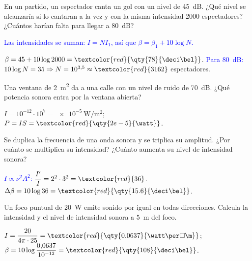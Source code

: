 \begin{exercise}
    En un partido, un espectador canta un gol con un nivel de \qty{45}{\deci\bel}. ¿Qué nivel se alcanzaría si lo cantaran a la
    vez y con la misma intensidad 2000 espectadores? ¿Cuántos harían falta para llegar a \qty{80}{\deci\bel}?
    \begin{solu}
        \textcolor{blue}{Las intensidades se suman: \(I = N I_1\), así que \(\beta = \beta_1 + 10\log N\).}

        \(\beta = 45 + 10\log 2000 = \textcolor{red}{\qty{78}{\deci\bel}}\).
        \textcolor{blue}{Para \qty{80}{\deci\bel}:} \(10\log N = 35 \Rightarrow N = 10^{3{,}5} \approx \textcolor{red}{3162}\) espectadores.
    \end{solu}
\end{exercise}

\begin{exercise}
    Una ventana de \qty{2}{\square\m} da a una calle con un nivel de ruido de \qty{70}{\deci\bel}. ¿Qué potencia sonora entra
    por la ventana abierta?
    \begin{solu}
        \(I = 10^{-12}\cdot 10^{7} = \qty{e-5}{\watt\per\square\m}\); \(P = I S = \textcolor{red}{\qty{2e-5}{\watt}}\).
    \end{solu}
\end{exercise}

\begin{exercise}
    Se duplica la frecuencia de una onda sonora y se triplica su amplitud. ¿Por cuánto se multiplica su intensidad? ¿Cuánto
    aumenta su nivel de intensidad sonora?
    \begin{solu}
        \textcolor{blue}{\(I \propto \nu^2 A^2\):} \(\dfrac{I'}{I} = 2^2\cdot 3^2 = \textcolor{red}{36}\).
        \(\Delta\beta = 10\log 36 = \textcolor{red}{\qty{15.6}{\deci\bel}}\).
    \end{solu}
\end{exercise}

\begin{exercise}
    Un foco puntual de \qty{20}{\watt} emite sonido por igual en todas direcciones. Calcula la intensidad y el nivel de
    intensidad sonora a \qty{5}{\m} del foco.
    \begin{solu}
        \(I = \dfrac{20}{4\pi\cdot 25} = \textcolor{red}{\qty{0.0637}{\watt\per\square\m}}\);
        \(\beta = 10\log\dfrac{0{,}0637}{10^{-12}} = \textcolor{red}{\qty{108}{\deci\bel}}\).
    \end{solu}
\end{exercise}

